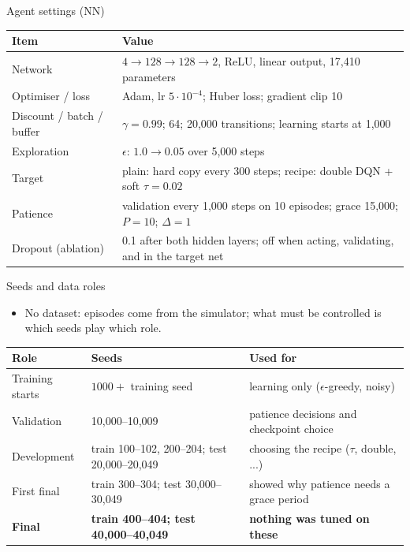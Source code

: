 \documentclass[aspectratio=169]{beamer}
\begin{document}
\begin{frame}{Agent settings (NN)}
\small
\begin{table}
\centering
\begin{tabular}{ll}
\toprule
\textbf{Item} & \textbf{Value}\\
\midrule
Network & $4\to128\to128\to2$, ReLU, linear output, 17,410 parameters\\
Optimiser / loss & Adam, lr $5\cdot10^{-4}$; Huber loss; gradient clip 10\\
Discount / batch / buffer & $\gamma=0.99$; 64; 20,000 transitions; learning starts at 1,000\\
Exploration & $\epsilon$: $1.0\to0.05$ over 5,000 steps\\
Target & plain: hard copy every 300 steps; recipe: double DQN + soft $\tau=0.02$\\
Patience & validation every 1,000 steps on 10 episodes; grace 15,000; $P=10$; $\Delta=1$\\
Dropout (ablation) & 0.1 after both hidden layers; off when acting, validating, and in the target net\\
\bottomrule
\end{tabular}
\end{table}
\end{frame}

\begin{frame}{Seeds and data roles}
\begin{itemize}
  \item No dataset: episodes come from the simulator; what must be controlled is \alert{which seeds play which role}.
\end{itemize}
\small
\begin{table}
\centering
\begin{tabular}{lll}
\toprule
\textbf{Role} & \textbf{Seeds} & \textbf{Used for}\\
\midrule
Training starts & $1000+$ training seed & learning only ($\epsilon$-greedy, noisy)\\
Validation & 10,000--10,009 & patience decisions and checkpoint choice\\
Development & train 100--102, 200--204; test 20,000--20,049 & choosing the recipe ($\tau$, double, ...)\\
First final & train 300--304; test 30,000--30,049 & showed why patience needs a grace period\\
\textbf{Final} & \textbf{train 400--404; test 40,000--40,049} & \textbf{nothing was tuned on these}\\
\bottomrule
\end{tabular}
\end{table}
\end{frame}
\end{document}
